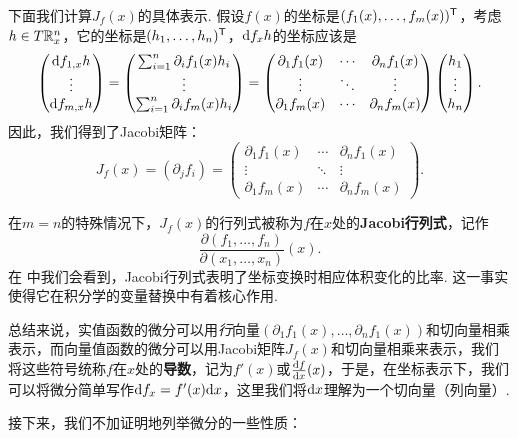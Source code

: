下面我们计算$J_f(x)$的具体表示. 假设$f(x)$的坐标是$(f_1(x),\dots,f_m(x))^{\mathsf{T}}$，考虑$h\in T\mathbb{R}_x^n$，它的坐标是$(h_1,\dots,h_n)^{\mathsf{T}}$，$\mathrm{d} f_x h$的坐标应该是
\[\begin{pmatrix}
    \mathrm{d} f_{1,x}h \\
    \vdots \\
    \mathrm{d} f_{m,x}h
\end{pmatrix}=
\begin{pmatrix}
    \sum_{i=1}^n\partial_i f_1(x)h_i \\
    \vdots \\
    \sum_{i=1}^n\partial_i f_m(x)h_i
\end{pmatrix}=
\begin{pmatrix}
    \partial_1 f_1(x) & \cdots & \partial_n f_1(x) \\
    \vdots & \ddots & \vdots \\
    \partial_1 f_m(x) & \cdots & \partial_n f_m(x)
\end{pmatrix}
\begin{pmatrix}
    h_1 \\
    \vdots \\
    h_n
\end{pmatrix}.\]
因此，我们得到了Jacobi矩阵：
\[J_f(x)=(\partial_j f_i)=\begin{pmatrix}
    \partial_1 f_1(x) & \cdots & \partial_n f_1(x) \\
    \vdots & \ddots & \vdots \\
    \partial_1 f_m(x) & \cdots & \partial_n f_m(x)
\end{pmatrix}.\]

在$m=n$的特殊情况下，$J_f(x)$的行列式被称为$f$在$x$处的\textbf{Jacobi行列式}，记作
\[\frac{\partial(f_1,\dots,f_n)}{\partial(x_1,\dots,x_n)}(x).\]
在 中我们会看到，Jacobi行列式表明了坐标变换时相应体积变化的比率. 这一事实使得它在积分学的变量替换中有着核心作用. 

总结来说，实值函数的微分可以用\emph{行}向量$(\partial_1 f_1(x),\dots,\partial_n f_1(x))$和切向量相乘表示，而向量值函数的微分可以用Jacobi矩阵$J_f(x)$和切向量相乘来表示，我们将这些符号统称$f$在$x$处的\textbf{导数}，记为$f'(x)$或$\frac{\mathrm{d} f}{\mathrm{d} x}(x)$，于是，在坐标表示下，我们可以将微分简单写作$\mathrm{d} f_x=f'(x)\mathrm{d} x$，这里我们将$\mathrm{d} x$理解为一个切向量（列向量）. 

接下来，我们不加证明地列举微分的一些性质：

